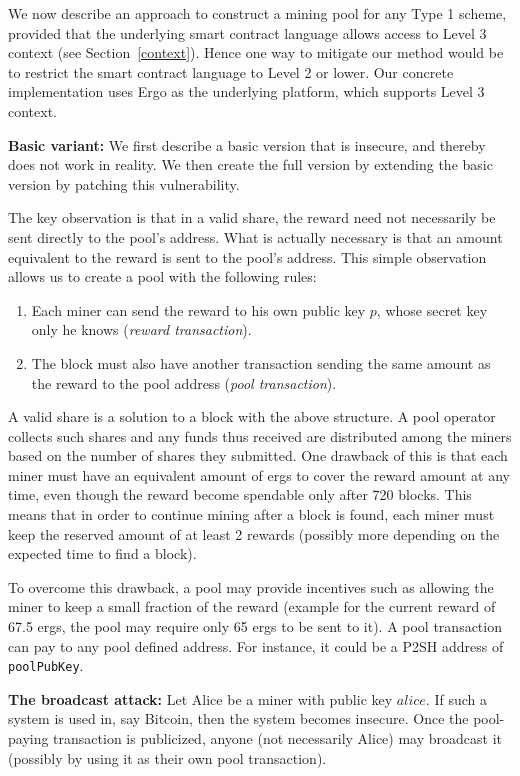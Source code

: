 \documentclass[11pt]{article}
\begin{document}
We now describe an approach to construct a mining pool for any Type 1 scheme, provided that the underlying smart contract language allows access to Level 3 context (see Section~\ref{context}). Hence one way to mitigate our method would be to restrict the smart contract language to Level 2 or lower. Our concrete implementation uses Ergo as the underlying platform, which supports Level 3 context.

\textbf{Basic variant:} We first describe a basic version that is insecure, and thereby does not work in reality. We then create the full version by extending the basic version by patching this vulnerability.   

The key observation is that in a valid share, the reward need not necessarily be sent directly to the pool's address. What is actually necessary is that an amount equivalent to the reward is sent to the pool's address. This simple observation allows us to create a pool with the following rules:
\begin{enumerate}
	\item Each miner can send the reward to his own public key $p$, whose secret key only he knows ({\em reward transaction}).
	\item The block must also have another transaction sending the same amount as the reward to the pool address ({\em pool transaction}).
\end{enumerate}

A valid share is a solution to a block with the above structure. A pool operator collects such shares and any funds thus received are distributed among the miners based on the number of shares they submitted. One drawback of this is that each miner must have an equivalent amount of ergs to cover the reward amount at any time, even though the reward become spendable only after 720 blocks. 
This means that in order to continue mining after a block is found, each miner must keep the reserved amount of at least 2 rewards (possibly more depending on the expected time to find a block).

 To overcome this drawback, a pool may provide incentives such as allowing the miner to keep a small fraction of the reward (example for the current reward of 67.5 ergs, the pool may require only 65 ergs to be sent to it). A pool transaction can pay to any pool defined address. For instance, it could be a P2SH address of \texttt{poolPubKey}. 


\textbf{The broadcast attack:} Let Alice be a miner with public key $alice$. If such a system is used in, say Bitcoin, then the system becomes insecure. Once the pool-paying transaction is publicized, anyone (not necessarily Alice) may broadcast it (possibly by using it as their own pool transaction). 
\end{document}
